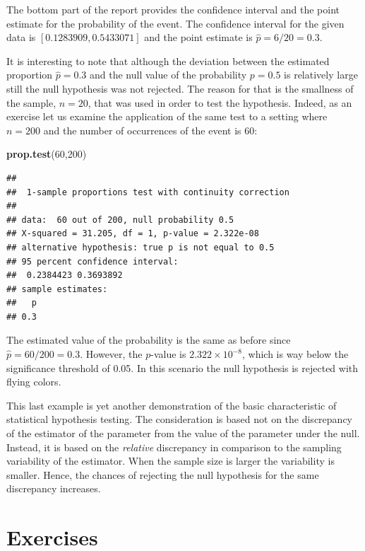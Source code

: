 \documentclass[
]{krantz}
\makeatletter
\newenvironment{Shaded}{\begin{snugshade}}{\end{snugshade}}
\newcommand{\DecValTok}[1]{\textcolor[rgb]{0.00,0.00,0.81}{#1}}
\newcommand{\KeywordTok}[1]{\textcolor[rgb]{0.13,0.29,0.53}{\textbf{#1}}}
\newcommand{\NormalTok}[1]{#1}
\newenvironment{kframe}{%
\medskip{}
\setlength{\fboxsep}{.8em}
 \def\at@end@of@kframe{}%
 \ifinner\ifhmode%
  \def\at@end@of@kframe{\end{minipage}}%
  \begin{minipage}{\columnwidth}%
 \fi\fi%
 \def\FrameCommand##1{\hskip\@totalleftmargin \hskip-\fboxsep
 \colorbox{shadecolor}{##1}\hskip-\fboxsep
     \hskip-\linewidth \hskip-\@totalleftmargin \hskip\columnwidth}%
 \MakeFramed {\advance\hsize-\width
   \@totalleftmargin\z@ \linewidth\hsize
   \@setminipage}}%
 {\par\unskip\endMakeFramed%
 \at@end@of@kframe}
\renewenvironment{Shaded}{\begin{kframe}}{\end{kframe}}
\theoremstyle{definition}
\theoremstyle{definition}
\theoremstyle{definition}
\theoremstyle{remark}
\makeatother
\begin{document}
The bottom part of the report provides the confidence interval and the
point estimate for the probability of the event. The confidence interval
for the given data is \([0.1283909, 0.5433071]\) and the point estimate is
\(\hat p = 6/20 = 0.3\).

It is interesting to note that although the deviation between the
estimated proportion \(\hat p = 0.3\) and the null value of the
probability \(p = 0.5\) is relatively large still the null hypothesis was
not rejected. The reason for that is the smallness of the sample,
\(n = 20\), that was used in order to test the hypothesis. Indeed, as an
exercise let us examine the application of the same test to a setting
where \(n = 200\) and the number of occurrences of the event is 60:

\begin{Shaded}
\begin{Highlighting}[]
\KeywordTok{prop.test}\NormalTok{(}\DecValTok{60}\NormalTok{,}\DecValTok{200}\NormalTok{)}
\end{Highlighting}
\end{Shaded}

\begin{verbatim}
## 
##  1-sample proportions test with continuity correction
## 
## data:  60 out of 200, null probability 0.5
## X-squared = 31.205, df = 1, p-value = 2.322e-08
## alternative hypothesis: true p is not equal to 0.5
## 95 percent confidence interval:
##  0.2384423 0.3693892
## sample estimates:
##   p 
## 0.3
\end{verbatim}

The estimated value of the probability is the same as before since
\(\hat p = 60/200 = 0.3\). However, the \(p\)-value is
\(2.322 \times 10^{-8}\), which is way below the significance threshold of
0.05. In this scenario the null hypothesis is rejected with flying
colors.

This last example is yet another demonstration of the basic
characteristic of statistical hypothesis testing. The consideration is
based not on the discrepancy of the estimator of the parameter from the
value of the parameter under the null. Instead, it is based on the
\emph{relative} discrepancy in comparison to the sampling variability of the
estimator. When the sample size is larger the variability is smaller.
Hence, the chances of rejecting the null hypothesis for the same
discrepancy increases.

\hypertarget{exercises-7}{%
\section{Exercises}\label{exercises-7}}
\end{document}
